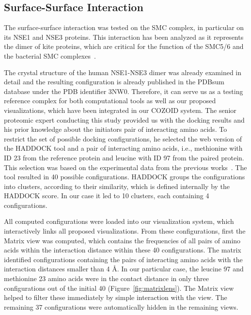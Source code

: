 \documentclass{bmcart}
\def\MatView {Matrix view\xspace}
\begin{document}
\subsection*{Surface-Surface Interaction}
The surface-surface interaction was tested on the SMC complex, in particular on its NSE1 and NSE3 proteins. 
This interaction has been analyzed as it represents the dimer of kite proteins, which are critical for the function of the SMC5/6 and the bacterial SMC complexes~\cite{Zabrady2016,Palecek2015,Doyle2010}. 

The crystal structure of the human NSE1-NSE3 dimer was already examined in detail and the resulting configuration is already published in the PDBsum database under the PDB identifier 3NW0. 
Therefore, it can serve us as a testing reference complex for both computational tools as well as our proposed visualizations, which have been integrated in our COZOID system.
The senior proteomic expert conducting this study provided us with the docking results and his prior knowledge about the initiators pair of interacting amino acids.
To restrict the set of possible docking configurations, he selected the web version of the HADDOCK tool and a pair of interacting amino acids, i.e., methionine with ID 23 from the reference protein and leucine with ID 97 from the paired protein.
This selection was based on the experimental data from the previous works~\cite{Hudson2011,Kozakova,Crabben}.
The tool resulted in 40 possible configurations.
HADDOCK groups the configurations into clusters, according to their similarity, which is defined internally by the HADDOCK score.
In our case it led to 10 clusters, each containing 4 configurations.

All computed configurations were loaded into our visualization system, which interactively links all proposed visualizations.
From these configurations, first the \MatView was computed, which contains the frequencies of all pairs of amino acids within the interaction distance within these 40 configurations.
The matrix identified configurations containing the pairs of interacting amino acids with the interaction distances smaller than 4 \AA.
In our particular case, the leucine 97 and methionine 23 amino acids were in the contact distance in only three configurations out of the initial 40 (Figure~\ref{fig:matrixlens}). 
The Matrix view helped to filter these immediately by simple interaction with the view. 
The remaining 37 configurations were automatically hidden in the remaining views.
\end{document}
